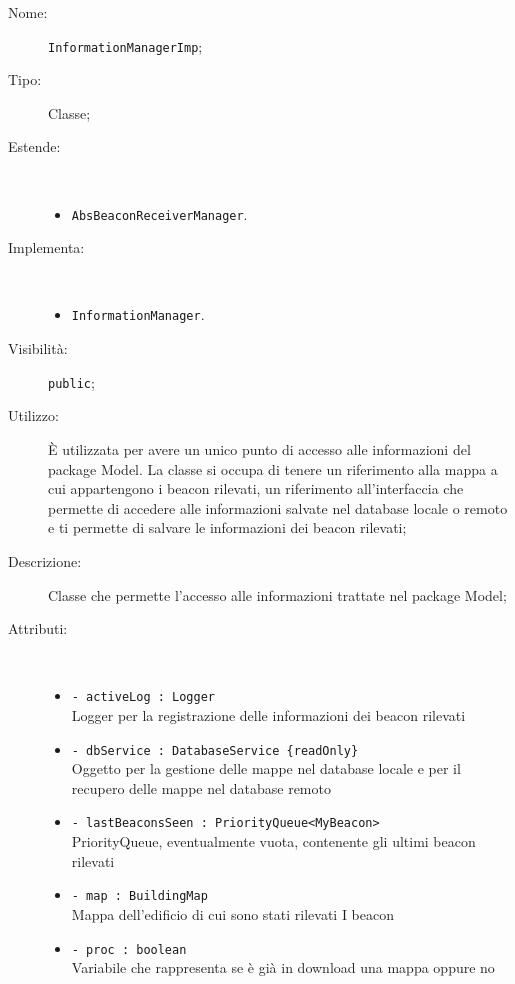 \documentclass[../DefinizioneDiProdotto.tex]{subfiles}
\begin{document}
\begin{description}
	\item[Nome:] \texttt{InformationManagerImp};
	\item[Tipo:] Classe;
	\item[Estende:] \
	\begin{itemize}
		\item \texttt{AbsBeaconReceiverManager}.
	\end{itemize}
	\item[Implementa:] \
	\begin{itemize}
		\item \texttt{InformationManager}.
		
	\end{itemize}
	\item[Visibilità:] \texttt{public};
	\item[Utilizzo:] È utilizzata per avere un unico punto di accesso alle informazioni del package Model. La classe si occupa di tenere un riferimento alla mappa a cui appartengono i beacon rilevati, un riferimento all'interfaccia che permette di accedere alle informazioni salvate nel database locale o remoto e ti permette di salvare le informazioni dei beacon rilevati;
	\item[Descrizione:] Classe che permette l'accesso alle informazioni trattate nel package Model;
	\item[Attributi:] \
	\begin{itemize}
		\item \texttt{- activeLog : Logger}\\
		Logger per la registrazione delle informazioni dei beacon rilevati
		
		\item \texttt{- dbService : DatabaseService \{readOnly\}}\\
		Oggetto per la gestione delle mappe nel database locale e per il recupero delle mappe nel database remoto
		
		\item \texttt{- lastBeaconsSeen : PriorityQueue<MyBeacon>}\\
		PriorityQueue, eventualmente vuota, contenente gli ultimi beacon rilevati
		
		\item \texttt{- map : BuildingMap}\\
		Mappa dell'edificio di cui sono stati rilevati I beacon
		
		\item \texttt{- proc : boolean}\\
		Variabile che rappresenta se è già in download una mappa oppure no
		

\end{itemize}
\end{description}
\end{document}
